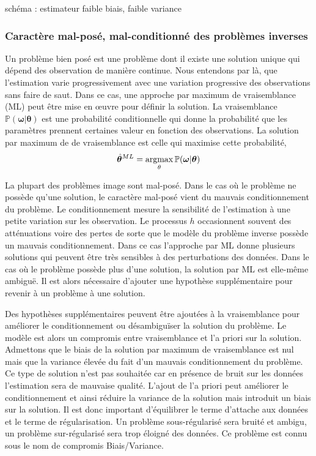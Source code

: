 \documentclass[../main/These_Mathias_Paget.tex]{subfiles}
\begin{document}
schéma : estimateur faible biais, faible variance


\subsubsection{Caractère mal-posé, mal-conditionné des problèmes inverses}

Un problème bien posé est une problème dont il existe une solution unique qui dépend des observation de manière continue. Nous entendons par là, que l'estimation varie progressivement avec une variation progressive des observations sans faire de saut. Dans ce cas, une approche par maximum de vraisemblance (ML) peut être mise en œuvre pour définir la solution. La vraisemblance $\mathbb{P}(\boldsymbol{\omega}|\boldsymbol{\theta})$ est une probabilité conditionnelle qui donne la probabilité que les paramètres prennent certaines valeur en fonction des observations. La solution par maximum de de vraisemblance est celle qui maximise cette probabilité,
\begin{equation}
	\hat{\boldsymbol{\theta}}^{ML} = \argmax_{\theta}{\mathbb{P}(\boldsymbol{\omega}|\boldsymbol{\theta})}
\end{equation}

	La plupart des problèmes image sont mal-posé. Dans le cas où le problème ne possède qu'une solution, le caractère mal-posé vient du mauvais conditionnement du problème. Le conditionnement mesure la sensibilité de l'estimation à une petite variation sur les observation. Le processus $h$ occasionnent souvent des atténuations voire des pertes de sorte que le modèle du problème inverse possède un mauvais conditionnement. Dans ce cas l'approche par ML donne plusieurs solutions qui peuvent être très sensibles à des perturbations des données. Dans le cas où le problème possède plus d'une solution, la solution par ML est elle-même ambiguë. Il est alors nécessaire d'ajouter une hypothèse supplémentaire pour revenir à un problème à une solution.
	
	Des hypothèses supplémentaires peuvent être ajoutées à la vraisemblance pour améliorer le conditionnement ou désambiguïser la solution du problème. Le modèle est alors un compromis entre vraisemblance et l'a priori sur la solution. Admettons que le biais de la solution par maximum de vraisemblance est nul mais que la variance élevée du fait d'un mauvais conditionnement du problème. Ce type de solution n'est pas souhaitée car en présence de bruit sur les données l'estimation sera de mauvaise qualité. L'ajout de l'a priori peut améliorer le conditionnement et ainsi réduire la variance de la solution mais introduit un biais sur la solution. Il est donc important d'équilibrer le terme d'attache aux données et le terme de régularisation. Un problème sous-régularisé sera bruité et ambigu, un problème sur-régularisé sera trop éloigné des données. Ce problème est connu sous le nom de compromis Biais/Variance.
\end{document}

